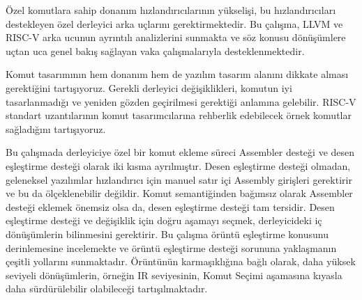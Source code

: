 Özel komutlara sahip donanım hızlandırıcılarının yükselişi, bu hızlandırıcıları destekleyen özel derleyici arka uçlarını gerektirmektedir. Bu çalışma, LLVM ve RISC-V arka ucunun ayrıntılı analizlerini sunmakta ve söz konusu dönüşümlere uçtan uca genel bakış sağlayan vaka çalışmalarıyla desteklenmektedir. 

Komut tasarımının hem donanım hem de yazılım tasarım alanını dikkate alması gerektiğini tartışıyoruz. Gerekli derleyici değişiklikleri, komutun iyi tasarlanmadığı ve yeniden gözden geçirilmesi gerektiği anlamına gelebilir. RISC-V standart uzantılarının komut tasarımcılarına rehberlik edebilecek örnek komutlar sağladığını tartışıyoruz.

Bu çalışmada derleyiciye özel bir komut ekleme süreci Assembler desteği ve desen eşleştirme desteği olarak iki kısma ayrılmıştır. Desen eşleştirme desteği olmadan, geleneksel yazılımlar hızlandırıcı için manuel satır içi Assembly girişleri gerektirir ve bu da ölçeklenebilir değildir. Komut semantiğinden bağımsız olarak Assembler desteği eklemek önemsiz olsa da, desen eşleştirme desteği tam tersidir. Desen eşleştirme desteği ve değişiklik için doğru aşamayı seçmek, derleyicideki iç dönüşümlerin bilinmesini gerektirir. Bu çalışma örüntü eşleştirme konusunu derinlemesine incelemekte ve örüntü eşleştirme desteği sorununa yaklaşmanın çeşitli yollarını sunmaktadır. Örüntünün karmaşıklığına bağlı olarak, daha yüksek seviyeli dönüşümlerin, örneğin IR seviyesinin, Komut Seçimi aşamasına kıyasla daha sürdürülebilir olabileceği tartışılmaktadır.






